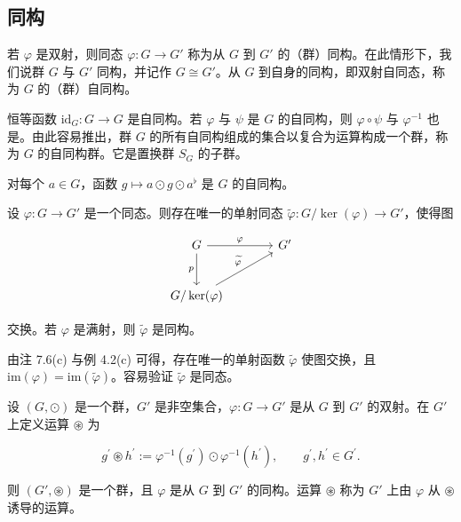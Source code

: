 \subsection*{同构}

若 $\varphi$ 是双射，则同态 $\varphi: G \to G'$ 称为从 $G$ 到 $G'$ 的（群）同构。在此情形下，我们说群 $G$ 与 $G'$ 同构，并记作 $G \cong G'$。从 $G$ 到自身的同构，即双射自同态，称为 $G$ 的（群）自同构。

\begin{example}

\begin{items}
\item

恒等函数 $\mathrm{id}_{G}: G \to G$ 是自同构。若 $\varphi$ 与 $\psi$ 是 $G$ 的自同构，则 $\varphi \circ \psi$ 与 $\varphi^{-1}$ 也是。由此容易推出，群 $G$ 的所有自同构组成的集合以复合为运算构成一个群，称为 $G$ 的自同构群。它是置换群 $S_{G}$ 的子群。

\item

对每个 $ a \in G $，函数 $ g \mapsto a \odot g \odot a^{\flat} $ 是 $ G $ 的自同构。

\item

设 $ \varphi: G \to G' $ 是一个同态。则存在唯一的单射同态 $ \widetilde{\varphi}: G/\ker(\varphi) \to G' $，使得图

\[
\begin{tikzcd}[row sep=2.6em, column sep=3.6em]
G \arrow[r, "\varphi"] \arrow[d, "p"'] & G' \\
G/\ker(\varphi) \arrow[ur, "\widetilde{\varphi}"]
\end{tikzcd}
\]

交换。若 $ \varphi $ 是满射，则 $ \widetilde{\varphi} $ 是同构。

\proofhead
由注 7.6(c) 与例 4.2(c) 可得，存在唯一的单射函数 $ \widetilde{\varphi} $ 使图交换，且 $ \mathrm{im}(\varphi) = \mathrm{im}(\widetilde{\varphi}) $。容易验证 $ \widetilde{\varphi} $ 是同态。
\item

设 $ (G, \odot) $ 是一个群，$ G' $ 是非空集合，$ \varphi: G \to G' $ 是从 $ G $ 到 $ G' $ 的双射。在 $ G' $ 上定义运算 $ \circledast $ 为

\[
g^{\prime}\circledast h^{\prime}:=\varphi^{-1}(g^{\prime})\odot\varphi^{-1}(h^{\prime}),\qquad g^{\prime},h^{\prime}\in G^{\prime}.
\]

则 $ (G', \circledast) $ 是一个群，且 $ \varphi $ 是从 $ G $ 到 $ G' $ 的同构。运算 $ \circledast $ 称为 $ G' $ 上由 $ \varphi $ 从 $ \circledast $ 诱导的运算。


\end{items}
\end{example}
